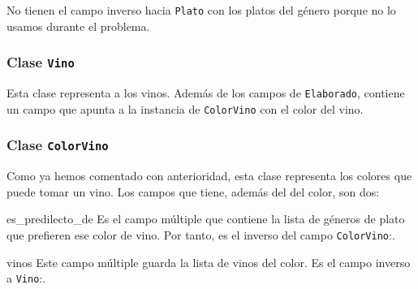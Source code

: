 No tienen el campo inverso hacia \verb+Plato+ con los platos del género porque
no lo usamos durante el problema.

\subsubsection{Clase \texttt{Vino}}
Esta clase representa a los vinos. Además de los campos de \verb+Elaborado+,
contiene un campo  que apunta a la instancia de \verb+ColorVino+
con el color del vino.

\subsubsection{Clase \texttt{ColorVino}}
Como ya hemos comentado con anterioridad, esta clase representa los colores que
puede tomar un vino. Los campos que tiene, además del  del color, son dos:
\begin{slotlist}
\item[es\_predilecto\_de] Es el campo múltiple que contiene la lista de géneros
  de plato que prefieren ese color de vino. Por tanto, es el inverso del campo
  \verb+ColorVino+:.
\item[vinos] Este campo múltiple guarda la lista de vinos del color. Es el campo inverso a \verb+Vino+:.
\end{slotlist}
